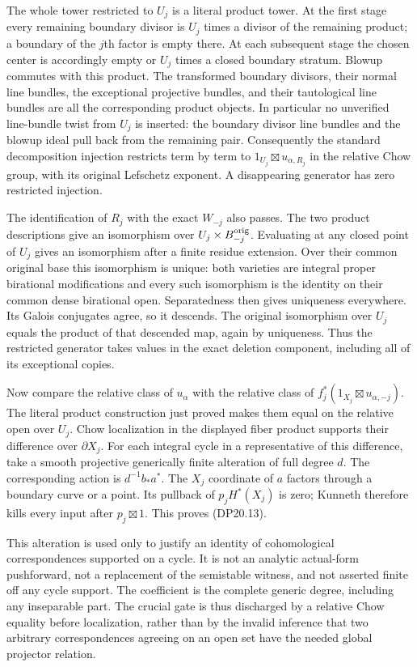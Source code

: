 The whole tower restricted to $U_j$ is a literal product tower.
At the first stage every remaining boundary divisor is
$U_j$ times a divisor of the remaining product; a boundary of
the $j$th factor is empty there. At each subsequent stage the
chosen center is accordingly empty or $U_j$ times a closed
boundary stratum. Blowup commutes with this product. The
transformed boundary divisors, their normal line bundles, the
exceptional projective bundles, and their tautological line
bundles are all the corresponding product objects. In
particular no unverified line-bundle twist from $U_j$ is inserted:
the boundary divisor line bundles and the blowup ideal pull
back from the remaining pair. Consequently the standard
decomposition injection restricts term by term to
$1_{U_j}\boxtimes u_{\alpha,R_j}$ in the relative Chow group,
with its original Lefschetz exponent. A disappearing generator
has zero restricted injection.

The identification of $R_j$ with the exact $W_{-j}$ also passes.
The two product descriptions give an isomorphism over
$U_j\times B_{-j}^{\rm orig}$. Evaluating at any closed point
of $U_j$ gives an isomorphism after a finite residue extension.
Over their common original base this isomorphism is unique:
both varieties are integral proper birational modifications
and every such isomorphism is the identity on their common
dense birational open. Separatedness then gives uniqueness
everywhere. Its Galois conjugates agree, so it descends.
The original isomorphism over $U_j$ equals the product of
that descended map, again by uniqueness. Thus the restricted
generator takes values in the exact deletion component,
including all of its exceptional copies.

Now compare the relative class of $u_\alpha$ with the relative
class of $f_j^*(1_{X_j}\boxtimes u_{\alpha,-j})$. The literal
product construction just proved makes them equal on the
relative open over $U_j$. Chow localization in the displayed
fiber product supports their difference over $\partial X_j$.
For each integral cycle in a representative of this difference,
take a smooth projective generically finite alteration of full
degree $d$. The corresponding action is $d^{-1}b_*a^*$.
The $X_j$ coordinate of $a$ factors through a boundary curve
or a point. Its pullback of $p_jH^*(X_j)$ is zero; Kunneth
therefore kills every input after $p_j\boxtimes1$.
This proves (DP20.13).

This alteration is used only to justify an identity of
cohomological correspondences supported on a cycle. It is not
an analytic actual-form pushforward, not a replacement of the
semistable witness, and not asserted finite off any cycle support.
The coefficient is the complete generic degree, including any
inseparable part. The crucial gate is thus discharged by a
relative Chow equality before localization, rather than by the
invalid inference that two arbitrary correspondences agreeing
on an open set have the needed global projector relation.

